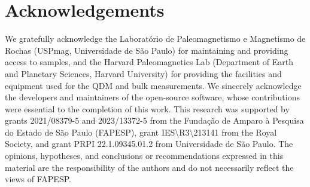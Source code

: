 \documentclass[onecolumn,12pt,a4paper]{article}
\begin{document}
\section{Acknowledgements}

We gratefully acknowledge the Laboratório de Paleomagnetismo e Magnetismo de Rochas (USPmag, Universidade de São Paulo) for maintaining and providing access to samples, and the Harvard Paleomagnetics Lab (Department of Earth and Planetary Sciences, Harvard University) for providing the facilities and equipment used for the QDM and bulk measurements. We sincerely acknowledge the developers and maintainers of the open-source software, whose contributions were essential to the completion of this work. This research was supported by grants 2021/08379-5 and 2023/13372-5 from the Fundação de Amparo à Pesquisa do Estado de São Paulo (FAPESP), grant IES\textbackslash{}R3\textbackslash{}213141 from the Royal Society, and grant PRPI 22.1.09345.01.2 from Universidade de São Paulo.
The opinions, hypotheses, and conclusions or recommendations expressed in this material are the responsibility of the authors and do not necessarily reflect the views of FAPESP.






\end{document}
